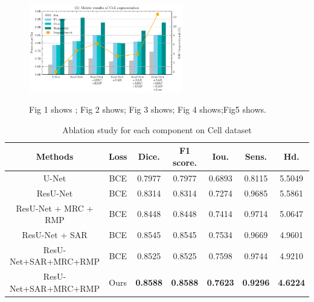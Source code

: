 \documentclass[UTF8]{article} %
\begin{document}
  \begin{figure}[ht]
    \begin{center}
    \includegraphics[width=0.6\textwidth]{covid_comparison.pdf}
    \vspace{-2mm}
    \caption{Fig 1 shows ; Fig 2 shows; Fig 3 shows; Fig 4 shows;Fig5 shows.} 
    \vspace{-2mm}
    \label{fig:covid_comparison}
    \end{center}
    \vspace{-0.35cm}
  \end{figure}

  \begin{table}[H]
    \vspace{-2mm}
    \begin{center}\small
    \caption{Ablation study for each component on Cell dataset}
    \label{loss-table}
    \begin{tabular}{ccccccc}
      
    \toprule
    Methods & Loss & Dice. & F1 score. & Iou. & Sens. & Hd.\\
    \midrule
      U-Net                & BCE & 0.7977 & 0.7977 & 0.6893 & 0.8115 & 5.5049\\
      ResU-Net             & BCE & 0.8314 & 0.8314 & 0.7274 & 0.9685 & 5.5861\\
      ResU-Net + MRC + RMP & BCE & 0.8448 & 0.8448 & 0.7414 & 0.9714 & 5.0647\\
      ResU-Net + SAR       & BCE & 0.8545 & 0.8545 & 0.7534 & 0.9669 & 4.9601\\
      ResU-Net+SAR+MRC+RMP & BCE & 0.8525 & 0.8525 & 0.7598 & 0.9744 & 4.9210\\
      ResU-Net+SAR+MRC+RMP & Ours & \textbf{0.8588} & \textbf{0.8588} & \textbf{0.7623} & \textbf{0.9296} & \textbf{4.6224}\\
  \bottomrule    
    \end{tabular}
    \end{center}
    \vspace{-4mm}
  \end{table}
\end{document}
